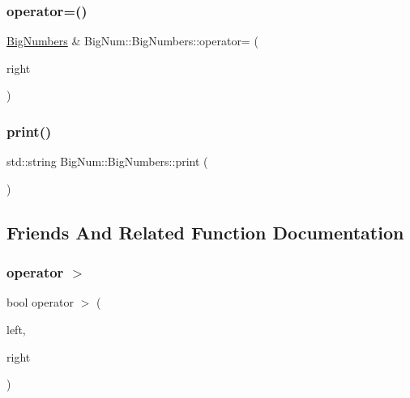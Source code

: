 \mbox{\label{class_big_num_1_1_big_numbers_a58d5b06cac7d5ca322d4550821f8edcf}} 
\subsubsection{\texorpdfstring{operator=()}{operator=()}}
{\footnotesize\ttfamily \mbox{\hyperlink{class_big_num_1_1_big_numbers}{Big\+Numbers}} \& Big\+Num\+::\+Big\+Numbers\+::operator= (\begin{DoxyParamCaption}\item[{const \mbox{\hyperlink{class_big_num_1_1_big_numbers}{Big\+Numbers}} \&}]{right }\end{DoxyParamCaption})}

\mbox{\label{class_big_num_1_1_big_numbers_aecf5b4256cb25c3b1e3c5a12138844f6}} 
\subsubsection{\texorpdfstring{print()}{print()}}
{\footnotesize\ttfamily std\+::string Big\+Num\+::\+Big\+Numbers\+::print (\begin{DoxyParamCaption}{ }\end{DoxyParamCaption})}



\subsection{Friends And Related Function Documentation}
\mbox{\label{class_big_num_1_1_big_numbers_a433564007a70fb306c9937553e387a14}} 
\subsubsection{\texorpdfstring{operator $>$}{operator >}}
{\footnotesize\ttfamily bool operator $>$ (\begin{DoxyParamCaption}\item[{const \mbox{\hyperlink{class_big_num_1_1_big_numbers}{Big\+Numbers}} \&}]{left,  }\item[{const \mbox{\hyperlink{class_big_num_1_1_big_numbers}{Big\+Numbers}} \&}]{right }\end{DoxyParamCaption})\hspace{0.3cm}{\ttfamily [friend]}}

